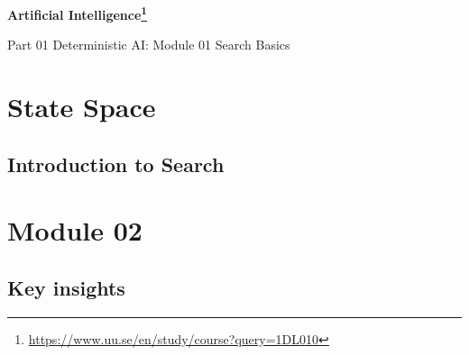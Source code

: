 \documentclass[./main.tex]{subfiles}
\begin{document}
\pagecolor{UUlightgrey}

{\LARGE\bf Artificial Intelligence\footnote{\url{https://www.uu.se/en/study/course?query=1DL010}}}

\vspace{12pt}

{\Large Part 01 Deterministic AI: Module 01 Search Basics}

\vspace{12pt}

\section{State Space}

\subsection{Introduction to Search}

\newpage

\section{Module 02}

\subsection{Key insights}
\end{document}
